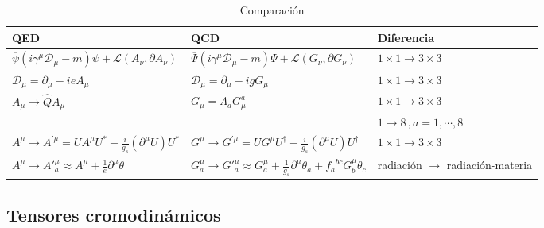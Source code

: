 \begin{frame}
  \begin{table}
    \centering
    \begin{tabular}{lll}
      QED & QCD & Diferencia\\\hline
$      \overline{\psi}\left(i\gamma^\mu\mathcal{D}_\mu-m\right)\psi +\mathcal{L} \left(A_{\nu},\partial A_{\nu}  \right)$ & $      \overline{\Psi}\left(i\gamma^\mu\mathcal{D}_\mu-m\right)\Psi +\mathcal{L} \left(G_{\nu},\partial G_{\nu}  \right)$ & $1\times 1 \to 3\times 3$\\ 
$\mathcal{D}_{\mu}=\partial_{\mu}-i e A_{\mu}$ & $\mathcal{D}_{\mu}=\partial_{\mu}-i g G_{\mu}$ & $1\times 1 \to 3\times 3$\\ 
$A_{\mu}\to \widehat{Q}A_{\mu}$ & $G_{\mu}=\Lambda_{a}G_{\mu}^{a}$ & $1\times 1 \to 3\times 3$\\ 
&& $1\to 8\,, a=1,\cdots,8$\\
$    {A}^\mu\to {A}^{\prime\mu}=U{A}^\mu U^{*}-\frac{i}{g_s}\left(\partial^\mu U\right)U^*$&
$ {G}^\mu\to {G}^{\prime\mu}=U{G}^\mu U^{\dagger}-\frac{i}{g_s}\left(\partial^\mu U\right)U^\dagger$
&$1\times 1 \to 3\times 3$\\ 
  $A^\mu\to {A'}^\mu_a\approx A^\mu+\frac{1}{e}\partial^\mu\theta$ &
$G^\mu_a\to {G'}^\mu_a\approx G^\mu_a+\frac{1}{g_s}\partial^\mu\theta_a+{f_a}^{bc}G^\mu_b\theta_c$ &\parbox{3.5cm}{radiación $\to$ ra\-dia\-ción\--ma\-teria}  \\
    \end{tabular}
    \caption{Comparación}
  \end{table}
\end{frame}


\subsection{Tensores cromodinámicos}

